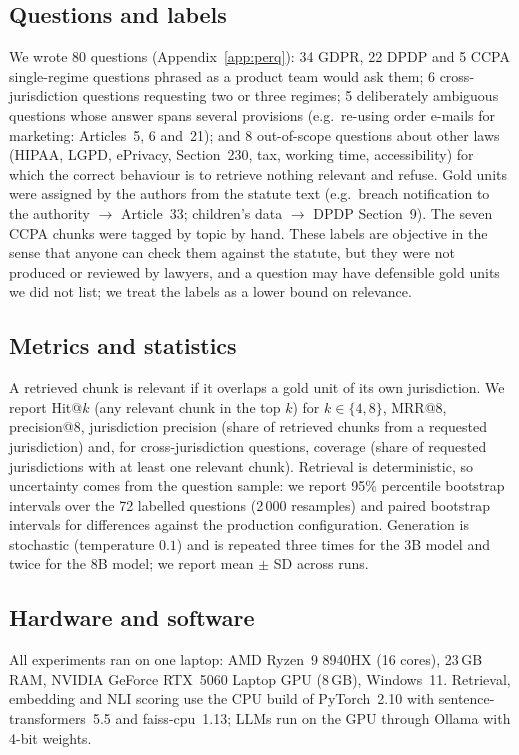 \documentclass[conference]{IEEEtran}
\begin{document}
\subsection{Questions and labels}
We wrote 80 questions (Appendix~\ref{app:perq}): 34 GDPR, 22 DPDP and 5 CCPA single-regime questions phrased as a product team would ask them; 6 cross-jurisdiction questions requesting two or three regimes; 5 deliberately ambiguous questions whose answer spans several provisions (e.g.\ re-using order e-mails for marketing: Articles~5, 6 and~21); and 8 out-of-scope questions about other laws (HIPAA, LGPD, ePrivacy, Section~230, tax, working time, accessibility) for which the correct behaviour is to retrieve nothing relevant and refuse. Gold units were assigned by the authors from the statute text (e.g.\ breach notification to the authority $\to$ Article~33; children's data $\to$ DPDP Section~9). The seven CCPA chunks were tagged by topic by hand. These labels are objective in the sense that anyone can check them against the statute, but they were not produced or reviewed by lawyers, and a question may have defensible gold units we did not list; we treat the labels as a lower bound on relevance.

\subsection{Metrics and statistics}
A retrieved chunk is relevant if it overlaps a gold unit of its own jurisdiction. We report Hit@$k$ (any relevant chunk in the top $k$) for $k\in\{4,8\}$, MRR@8, precision@8, jurisdiction precision (share of retrieved chunks from a requested jurisdiction) and, for cross-jurisdiction questions, coverage (share of requested jurisdictions with at least one relevant chunk). Retrieval is deterministic, so uncertainty comes from the question sample: we report 95\% percentile bootstrap intervals over the 72 labelled questions (2\,000 resamples) and paired bootstrap intervals for differences against the production configuration. Generation is stochastic (temperature $0.1$) and is repeated three times for the 3B model and twice for the 8B model; we report mean $\pm$ SD across runs.

\subsection{Hardware and software}
All experiments ran on one laptop: AMD Ryzen~9 8940HX (16 cores), 23\,GB RAM, NVIDIA GeForce RTX~5060 Laptop GPU (8\,GB), Windows~11. Retrieval, embedding and NLI scoring use the CPU build of PyTorch~2.10 with sentence-transformers~5.5 and faiss-cpu~1.13; LLMs run on the GPU through Ollama with 4-bit weights.
\end{document}
